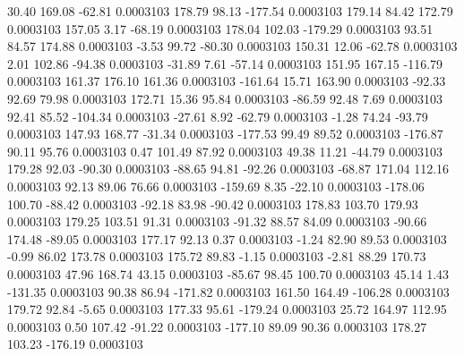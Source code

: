        30.40      169.08      -62.81     0.0003103
      178.79       98.13     -177.54     0.0003103
      179.14       84.42      172.79     0.0003103
      157.05        3.17      -68.19     0.0003103
      178.04      102.03     -179.29     0.0003103
       93.51       84.57      174.88     0.0003103
       -3.53       99.72      -80.30     0.0003103
      150.31       12.06      -62.78     0.0003103
        2.01      102.86      -94.38     0.0003103
      -31.89        7.61      -57.14     0.0003103
      151.95      167.15     -116.79     0.0003103
      161.37      176.10      161.36     0.0003103
     -161.64       15.71      163.90     0.0003103
      -92.33       92.69       79.98     0.0003103
      172.71       15.36       95.84     0.0003103
      -86.59       92.48        7.69     0.0003103
       92.41       85.52     -104.34     0.0003103
      -27.61        8.92      -62.79     0.0003103
       -1.28       74.24      -93.79     0.0003103
      147.93      168.77      -31.34     0.0003103
     -177.53       99.49       89.52     0.0003103
     -176.87       90.11       95.76     0.0003103
        0.47      101.49       87.92     0.0003103
       49.38       11.21      -44.79     0.0003103
      179.28       92.03      -90.30     0.0003103
      -88.65       94.81      -92.26     0.0003103
      -68.87      171.04      112.16     0.0003103
       92.13       89.06       76.66     0.0003103
     -159.69        8.35      -22.10     0.0003103
     -178.06      100.70      -88.42     0.0003103
      -92.18       83.98      -90.42     0.0003103
      178.83      103.70      179.93     0.0003103
      179.25      103.51       91.31     0.0003103
      -91.32       88.57       84.09     0.0003103
      -90.66      174.48      -89.05     0.0003103
      177.17       92.13        0.37     0.0003103
       -1.24       82.90       89.53     0.0003103
       -0.99       86.02      173.78     0.0003103
      175.72       89.83       -1.15     0.0003103
       -2.81       88.29      170.73     0.0003103
       47.96      168.74       43.15     0.0003103
      -85.67       98.45      100.70     0.0003103
       45.14        1.43     -131.35     0.0003103
       90.38       86.94     -171.82     0.0003103
      161.50      164.49     -106.28     0.0003103
      179.72       92.84       -5.65     0.0003103
      177.33       95.61     -179.24     0.0003103
       25.72      164.97      112.95     0.0003103
        0.50      107.42      -91.22     0.0003103
     -177.10       89.09       90.36     0.0003103
      178.27      103.23     -176.19     0.0003103
